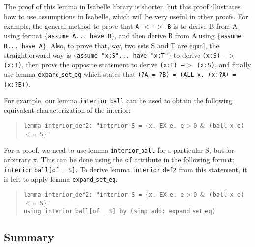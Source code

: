 \documentclass[11pt]{article}
\newcommand{\ind}{\phantom{a}\quad}
\newcommand{\prog}[1]{\par\noindent\begin{quote}#1\end{quote}\par\noindent}
\begin{document}
The proof of this lemma in Isabelle library is shorter, but this proof illustrates how to use assumptions in Isabelle, which will be very useful in other proofs. For example, the general method to prove that {\tt A $<$-$>$ B} is to derive B from A using format {\tt $\{$assume A... have B$\}$}, and then derive B from A using {\tt $\{$assume B... have A$\}$}. Also, to prove that, say, two sets S and T are equal, the straightforward way is {\tt $\{$assume "x:S"... have "x:T"$\}$} to derive {\tt (x:S) --$>$ (x:T)}, then prove the opposite statement to derive {\tt (x:T) --$>$ (x:S)}, and finally use lemma {\tt expand$\_$set$\_$eq} which states that {\tt (?A = ?B) = (ALL x. (x:?A) = (x:?B))}.

For example, our lemma {\tt interior$\_$ball} can be used to obtain the following equivalent characterization of the interior:
\prog{\tt lemma interior$\_$def2: "interior S = $\{$x. EX e. e$>$0 $\&$ (ball x e) $<$= S$\}$"}%

For a proof, we need to use lemma {\tt interior$\_$ball}
for a particular S, but for arbitrary x. This can be done using the {\tt of} attribute in the following format: {\tt interior$\_$ball[of $\_$ S]}. To derive lemma {\tt interior$\_$def2} from this statement, it is left to apply lemma {\tt expand$\_$set$\_$eq}.

\prog{\tt lemma interior$\_$def2: "interior S = $\{$x. EX e. e$>$0 $\&$ (ball x e) $<$= S$\}$"\\
    \ind using interior$\_$ball[of $\_$ S] by (simp add:~expand$\_$set$\_$eq)}%


\subsection{Summary}
\end{document}
